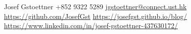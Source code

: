 \documentclass[grey]{hipstercv}
\newlength{\rightcolwidth}
\begin{document}
\begin{paracol}{2}




\vfill{} %

\setlength{\parindent}{0pt}
\begin{minipage}[t]{\rightcolwidth}
\begin{center}\fontfamily{\sfdefault}\selectfont \color{black!70}
{\small Josef Gstoettner  +852 9322 5289  \protect\url{jgstoettner@connect.ust.hk} \\ 
 \protect\url{https://github.com/JosefGst}  \protect\url{https://josefgst.github.io/blog/} \\ 
 \protect\url{https://www.linkedin.com/in/josef-gstoettner-437630172/} 
}
\end{center}
\end{minipage}


\end{paracol}
\end{document}
